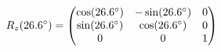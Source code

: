 \documentclass[preview]{standalone}
\begin{document}
\begin{align*}
\special{dvisvgm:raw <g id='unique000'>}R_z(26.6^\circ) = \begin{pmatrix} \cos(26.6^\circ) & -\sin(26.6^\circ) & 0 \\ \sin(26.6^\circ) & \cos(26.6^\circ) & 0 \\ 0 & 0 & 1 \end{pmatrix}\special{dvisvgm:raw </g>}
\end{align*}
\end{document}
